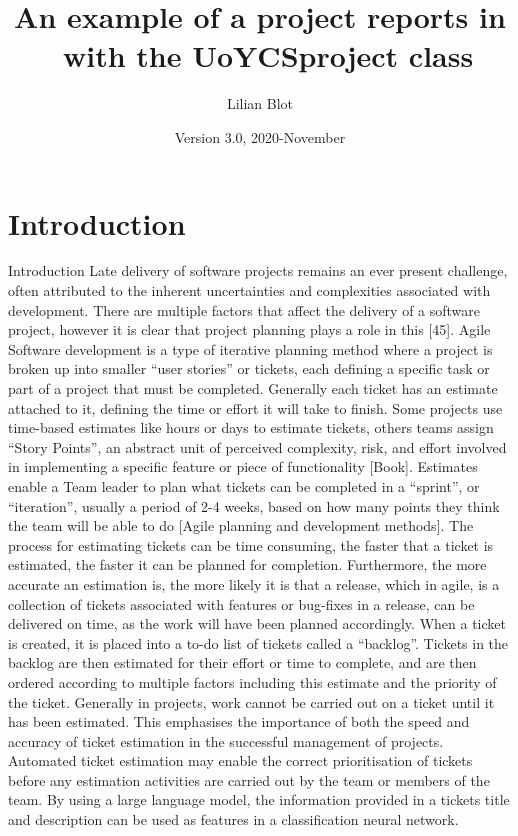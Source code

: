 \documentclass{UoYCSproject}
\author{Lilian Blot}
\title{An example of a project reports in \LaTeXe\ with the   \textsf{UoYCSproject} class}
\date{Version 3.0, 2020-November}
\begin{document}
    \maketitle
    \listoffigures
    \listoftables

\chapter{Introduction}
\label{cha:Introduction}
Introduction
Late delivery of software projects remains an ever present challenge, often attributed to the inherent uncertainties and complexities associated with development. There are multiple factors that affect the delivery of a software project, however it is clear that project planning plays a role in this [45].
Agile Software development is a type of iterative planning method where a project is broken up into smaller “user stories” or tickets, each defining a specific task or part of a project that must be completed. Generally each ticket has an estimate attached to it, defining the time or effort it will take to finish. Some projects use time-based estimates like hours or days to estimate tickets, others teams assign “Story Points”, an abstract unit of perceived complexity, risk, and effort involved in implementing a specific feature or piece of functionality [Book]. Estimates enable a Team leader to plan what tickets can be completed in a “sprint”, or “iteration”, usually a period of 2-4 weeks, based on how many points they think the team will be able to do [Agile planning and development methods]. The process for estimating tickets can be time consuming, the faster that a ticket is estimated, the faster it can be planned for completion. Furthermore, the more accurate an estimation is, the more likely it is that a release, which in agile, is a collection of tickets associated with features or bug-fixes in a release, can be delivered on time, as the work will have been planned accordingly.
When a ticket is created, it is placed into a to-do list of tickets called a “backlog”. Tickets in the backlog are then estimated for their effort or time to complete, and are then ordered according to multiple factors including this estimate and the priority of the ticket. Generally in projects, work cannot be carried out on a ticket until it has been estimated. This emphasises the importance of both the speed and accuracy of ticket estimation in the successful management of projects.
Automated ticket estimation may enable the correct prioritisation of tickets before any estimation activities are carried out by the team or members of the team.
By using a large language model, the information provided in a tickets title and description can be used as features in a classification neural network.
\end{document}
